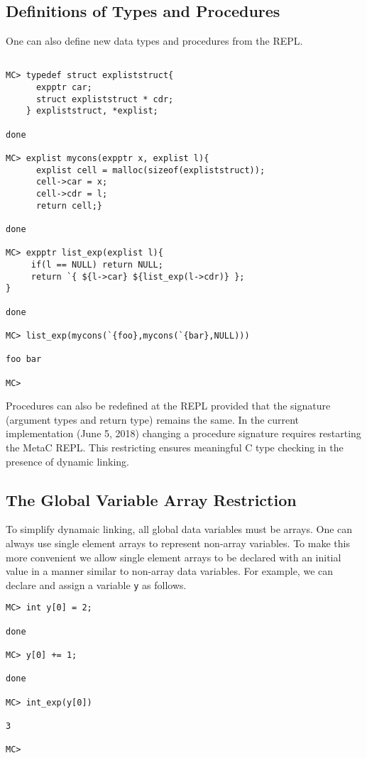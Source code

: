 \documentclass{article}
\begin{document}
\subsection{Definitions of Types and Procedures}

One can also define new data types and procedures from the REPL.

\begin{verbatim}

MC> typedef struct expliststruct{
      expptr car;
      struct expliststruct * cdr;
    } expliststruct, *explist;

done

MC> explist mycons(expptr x, explist l){
      explist cell = malloc(sizeof(expliststruct));
      cell->car = x;
      cell->cdr = l;
      return cell;}

done

MC> expptr list_exp(explist l){
     if(l == NULL) return NULL;
     return `{ ${l->car} ${list_exp(l->cdr)} };
}

done

MC> list_exp(mycons(`{foo},mycons(`{bar},NULL)))

foo bar

MC>
\end{verbatim}

Procedures can also be redefined at the REPL provided that the
signature (argument types and return type) remains the same.  In the
current implementation (June 5, 2018) changing a procedure signature
requires restarting the MetaC REPL.  This restricting ensures
meaningful C type checking in the presence of dynamic linking.

\subsection{The Global Variable Array Restriction}

To simplify dynamaic linking, all global data
variables must be arrays. One can always use single element
arrays to represent non-array variables.  To make this more convenient
we allow single element arrays to be declared with an initial value in a
manner similar to non-array data variables.  For example, we can declare and assign a variable {\tt y}
as follows.

\begin{verbatim}
MC> int y[0] = 2;

done

MC> y[0] += 1;

done

MC> int_exp(y[0])

3

MC>
\end{verbatim}
\end{document}
